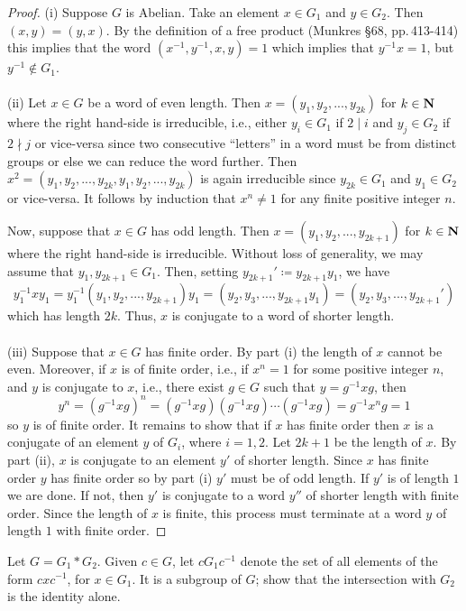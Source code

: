 \begin{proof}
(i) Suppose $G$ is Abelian. Take an element $x\in G_1$ and $y\in G_2$. Then
$(x,y)=(y,x)$. By the definition of a free product (Munkres \S68,
pp.\,413-414) this implies that the word $(x^{-1},y^{-1},x,y)=1$ which
implies that $y^{-1}x=1$, but $y^{-1}\notin G_1$.
\\\\
(ii) Let $x\in G$ be a word of even length. Then $x=(y_1,y_2,...,y_{2k})$
for $k\in\mathbf{N}$ where the right hand-side is irreducible, i.e., either
$y_i\in G_1$ if $2\mid i$ and $y_j\in G_2$ if $2\nmid j$ or vice-versa
since two consecutive ``letters'' in a word must be from distinct groups or
else we can reduce the word further. Then
$x^2=(y_1,y_2,...,y_{2k},y_1,y_2,...,y_{2k})$ is again irreducible since
$y_{2k}\in G_1$ and $y_1\in G_2$ or vice-versa. It follows by induction
that $x^n\neq 1$ for any finite positive integer $n$.

Now, suppose that $x\in G$ has odd length. Then $x=(y_1,y_2,...,y_{2k+1})$
for $k\in\mathbf{N}$ where the right hand-side is irreducible. Without loss of
generality, we may assume that $y_1,y_{2k+1}\in G_1$. Then, setting
$y_{2k+1}'\coloneqq y_{2k+1}y_1$, we have
\[
y_1^{-1}xy_1=y_1^{-1}(y_1,y_2,...,y_{2k+1})y_1=(y_2,y_3,...,y_{2k+1}y_1)=(y_2,y_3,...,y_{2k+1}')
\]
which has length $2k$. Thus, $x$ is conjugate to a word of shorter
length.
\\\\
(iii) Suppose that $x\in G$ has finite order. By part (i) the length of $x$
cannot be even. Moreover, if $x$ is of finite order, i.e., if $x^n=1$ for
some positive integer $n$, and $y$ is conjugate to $x$, i.e., there exist
$g\in G$ such that $y=g^{-1}xg$, then
\[
y^n=(g^{-1}xg)^n=(g^{-1}xg)(g^{-1}xg)\cdots(g^{-1}xg)=g^{-1}x^ng=1
\]
so $y$ is of finite order. It remains to show that if $x$ has finite order
then $x$ is a conjugate of an element $y$ of $G_i$, where $i=1,2$. Let
$2k+1$ be the length of $x$. By part (ii), $x$ is conjugate to an element
$y'$ of shorter length. Since $x$ has finite order $y$ has finite order so
by part (i) $y'$ must be of odd length. If $y'$ is of length $1$ we are
done. If not, then $y'$ is conjugate to a word $y''$ of shorter
length with finite order. Since the length of $x$ is finite, this process
must terminate at a word $y$ of length $1$ with finite order.
\end{proof}
\newpage
\begin{problem}[Munkres \S68, Ex.\,3]
Let $G=G_1*G_2$. Given $c\in G$, let $cG_1c^{-1}$ denote the set of all
elements of the form $cxc^{-1}$, for $x\in G_1$. It is a subgroup of $G$;
show that the intersection with $G_2$ is the identity alone.
\end{problem}
